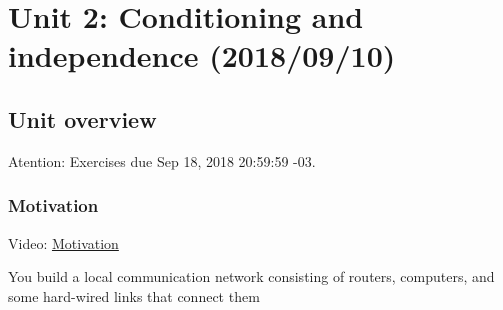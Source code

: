 \documentclass[pdftex, brazil, 12pt, twoside]{article}
\begin{document}
\newpage
\section{Unit 2: Conditioning and independence (2018/09/10)}
\label{un2}


\subsection{Unit overview}
\label{un2-ovw}

Atention: Exercises due Sep 18, 2018 20:59:59 -03.

\subsubsection{Motivation}
\label{un2-ovw-motiv}

Video: \href{https://www.youtube.com/watch?v=USpqFGeXmJY}{Motivation}

You build a local communication network consisting
of routers, computers, and some hard-wired links
that connect them

\begin{figure}[H]
  \begin{center}
  \end{center}
\end{figure}
\end{document}
